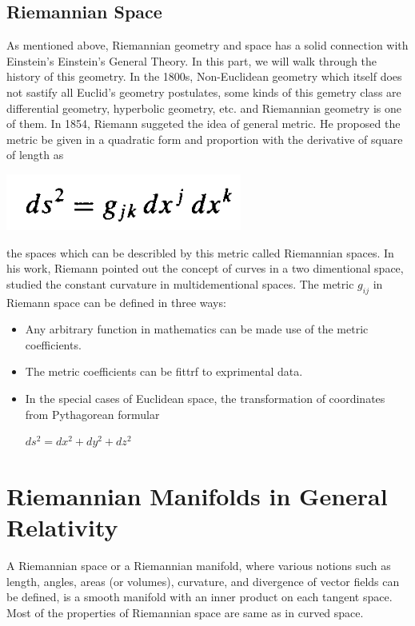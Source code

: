\documentclass[11pt,a4paper]{article}
\begin{document}
	 \subsection{Riemannian Space} 
	 As mentioned above, Riemannian geometry and space has a solid connection with Einstein's Einstein's General Theory. In this part, we will walk through the history of  this geometry.
	 In the 1800s, Non-Euclidean geometry which itself does not sastify all Euclid's geometry postulates, some kinds of this gemetry class are  differential geometry, hyperbolic geometry, etc. and Riemannian geometry is one of them. 
	 In 1854, Riemann suggeted the idea of general metric. He proposed the metric be given in  a quadratic form and proportion with the derivative of square of length as 
	 \begin{center}
	 	\includegraphics[scale=0.35]{./riemann_form.png}
	 \end{center}
	 the spaces which can be describled by this metric called Riemannian spaces. In his work, Riemann pointed out  the concept of curves in a two dimentional space, studied the constant curvature in multidementional spaces.
	 The metric $g_{ij}$ in Riemann space can be defined in three ways:
	 \begin{itemize}
	 	\setlength{\itemindent}{.2in}
	 	\item  Any arbitrary function in mathematics can be  made use of the metric coefficients.
	 	\item  The metric coefficients can be fittrf to exprimental data.
	 	\item  In the special cases of Euclidean space, the transformation of coordinates from Pythagorean  formular
	 	\begin{center}
	 		$ds^2 = dx^2 + dy^2 +dz^2$
	 	\end{center}
	 \end{itemize}
 	\section{Riemannian Manifolds in General Relativity}
 	A Riemannian space or a Riemannian manifold, where
 	various notions such as length, angles, areas (or
 	volumes), curvature, and divergence of vector
 	fields can be defined, is a smooth manifold with an inner product on each tangent space. 
 	Most of the properties of Riemannian space are same as in curved space.
\end{document}
